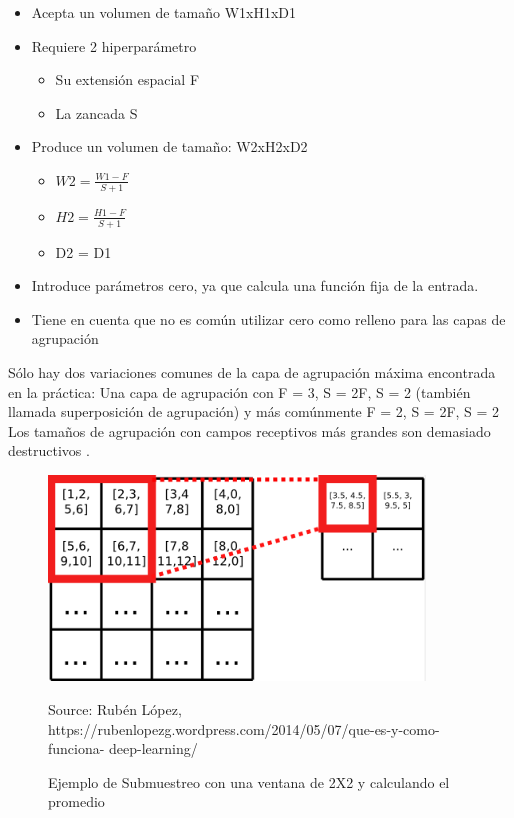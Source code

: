 \begin{itemize}
\item Acepta un volumen de tamaño W1xH1xD1
\item Requiere 2 hiperparámetro
  \begin{itemize}
  \item Su extensión espacial F
  \item La zancada S
  \end{itemize}
\item Produce un volumen de tamaño: W2xH2xD2
  \begin{itemize}
  \item $W2 =  \frac{W1 - F}{S + 1}$
  \item $H2 = \frac{H1 - F}{S + 1}$
  
  \item D2 = D1
  \end{itemize}
\item Introduce parámetros cero, ya que calcula una función fija de la entrada.
\item Tiene en cuenta que no es común utilizar cero como relleno para las capas de
agrupación
\end{itemize}

Sólo hay dos variaciones comunes de la capa de agrupación máxima encontrada
en la práctica: Una capa de agrupación con F = 3, S = 2F, S = 2 (también llamada
superposición de agrupación) y más comúnmente F = 2, S = 2F, S = 2 Los tamaños
de agrupación con campos receptivos más grandes son demasiado destructivos \cite{22RedesNeuronalesConvolu}.

\begin{figure}[H]
		\centering
		\includegraphics[width=100mm]{./Imagenes/submuestre.png}
		\caption{Ejemplo de Submuestreo con una ventana de 2X2 y calculando el promedio}
		Source: Rubén López, https://rubenlopezg.wordpress.com/2014/05/07/que-es-y-como-funciona-
deep-learning/
        \label{fig:submuestre}
\end{figure}


